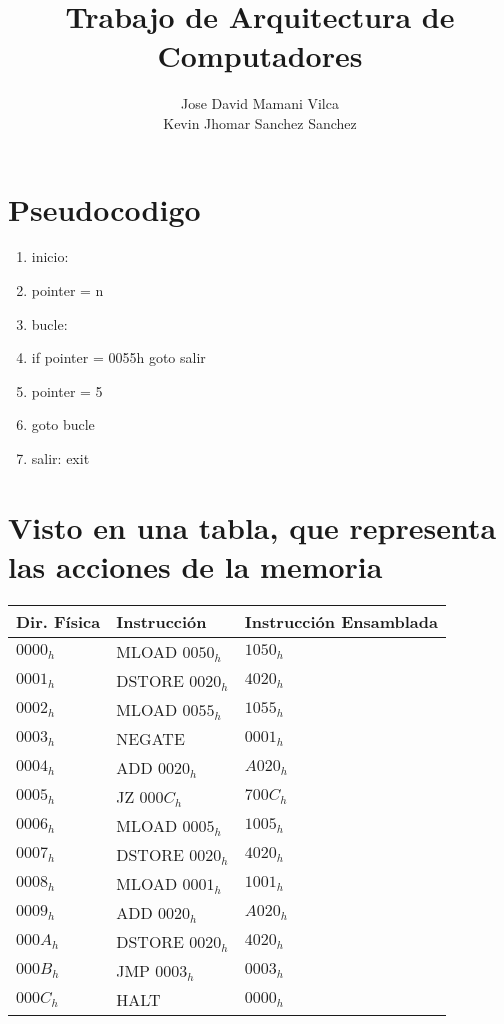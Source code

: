 \documentclass[11pt, conference]{IEEEtran}
\begin{document}
	\title{\bf Trabajo de Arquitectura de Computadores}
	\author{Jose David Mamani Vilca \\
		Kevin Jhomar Sanchez Sanchez \\}
	\maketitle
	
\section{Pseudocodigo}
\begin{enumerate}
	\item inicio: 
	\item \qquad pointer = n
	\item bucle:
	\item \qquad if pointer = 0055h goto salir
	\item \qquad \qquad pointer = 5
	\item \qquad \qquad goto bucle
	\item salir: exit
\end{enumerate}
\bigskip
\bigskip
\bigskip
\bigskip
\section{Visto en una tabla, que representa las acciones de la memoria}
\begin{table}[htb]
	\begin{center}
		\begin{tabular}{lll}
			\hline
			{\bf Dir. Física} & {\bf Instrucción} & {\bf Instrucción Ensamblada }  \\
			\hline
			$0000_h$ & MLOAD $0050_h$ & $1050_h$ \\ 
			$0001_h$ & DSTORE $0020_h$& $4020_h$ \\
			$0002_h$ & MLOAD $0055_h$& $1055_h$ \\ 
			$0003_h$ & NEGATE & $0001_h$ \\ 
			$0004_h$ & ADD $0020_h$& $A020_h$ \\ 
			$0005_h$ & JZ $000C_h$& $700C_h$  \\
			$0006_h$ & MLOAD $0005_h$& $1005_h$  \\ 
			$0007_h$ & DSTORE $0020_h$& $4020_h$  \\ 
			$0008_h$ & MLOAD $0001_h$& $1001_h$  \\ 
			$0009_h$ & ADD  $0020_h$& $A020_h$  \\  
			$000A_h$ & DSTORE $0020_h$& $4020_h$  \\  
			$000B_h$ & JMP $0003_h$& $0003_h$  \\ 
			$000C_h$ & HALT & $0000_h$ \\ 
		\end{tabular}
	\end{center}
\end{table}
\end{document}
